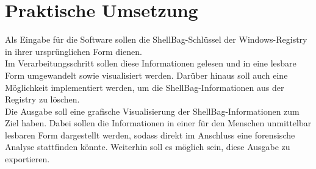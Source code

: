 \section{Praktische Umsetzung}
Als Eingabe für die Software sollen die ShellBag-Schlüssel der Windows-Registry in ihrer ursprünglichen Form dienen. \\
Im Verarbeitungsschritt sollen diese Informationen gelesen und in eine lesbare Form umgewandelt sowie visualisiert werden. Darüber hinaus soll auch eine Möglichkeit implementiert werden, um die ShellBag-Informationen aus der Registry zu löschen. \\
Die Ausgabe soll eine grafische Visualisierung der ShellBag-Informationen zum Ziel haben. Dabei sollen die Informationen in einer für den Menschen unmittelbar lesbaren Form dargestellt werden, sodass direkt im Anschluss eine forensische Analyse stattfinden könnte. Weiterhin soll es möglich sein, diese Ausgabe zu exportieren.
